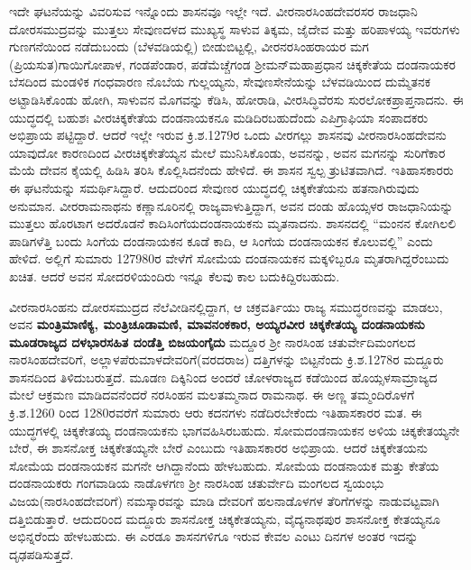 \vskip 2pt

ಇದೇ ಘಟನೆಯನ್ನು ವಿವರಿಸುವ ಇನ್ನೊಂದು ಶಾಸನವೂ ಇಲ್ಲೇ ಇದೆ. ವೀರನಾರಸಿಂಹದೇವರಸರ ರಾಜಧಾನಿ ದೋರಸಮುದ್ರವನ್ನು ಮುತ್ತಲು ಸೇವುಣದಳದ ಮುಖ್ಯಸ್ಥ ಸಾಳುವ ತಿಕ್ಕಮ, ಜೈದೇವ ಮತ್ತು ಹರಿಪಾಳಯ್ಯ ಇವರುಗಳು ಗುಣಗನೆಯಿಂದ ನಡೆದುಬಂದು (ಬೆಳವಡಿಯಲ್ಲಿ) ಬೀಡುಬಿಟ್ಟಲ್ಲಿ, ವೀರನರಸಿಂಹರಾಯರ ಮಗ (ಪ್ರಿಯಸುತ)\break ಗಾಯಿಗೋಪಾಳ, ಗಂಡಪೆಂಡಾರ, ಪಡೆಮೆಚ್ಚೆಗಂಡ ಶ‍್ರೀಮನ್​ಮಹಾಪ್ರಧಾನ ಚಿಕ್ಕಕೇತೆಯ ದಂಡನಾಯಕರ ಬೆಸದಿಂದ ಮಂಡಳಿಕ ಗಂಧವಾರಣ ನೊಬೆಯ ಗುಲ್ಲಯ್ಯನು, ಸೇವುಣಸೇನೆಯನ್ನು ಬೆಳವಡಿಯಿಂದ ದುಮ್ಮೆತನಕ ಅಟ್ಟಾಡಿಸಿಕೊಂಡು ಹೋಗಿ, ಸಾಳುವನ ಮೊಗವನ್ನು ಕೆಡಿಸಿ, ಹೋರಾಡಿ, ವೀರಸಿದ್ಧಿವೆರಸು ಸುರಲೋಕಪ್ರಾಪ್ತನಾದನು. ಈ ಯುದ್ಧದಲ್ಲಿ ಬಹುಶಃ ವೀರಚಿಕ್ಕಕೇತೆಯ ದಂಡನಾಯಕನೂ ಮಡಿದಿರಬಹುದೆಂದು ಎಪಿಗ್ರಾಫಿಯಾ ಸಂಪಾದಕರು ಅಭಿಪ್ರಾಯ ಪಟ್ಟಿದ್ದಾರೆ. ಆದರೆ ಇಲ್ಲೇ ಇರುವ ಕ್ರಿ.ಶ.1279ರ ಒಂದು ವೀರಗಲ್ಲು ಶಾಸನವು ವೀರನಾರಸಿಂಹದೇವನು ಯಾವುದೋ ಕಾರಣದಿಂದ ವೀರಚಿಕ್ಕಕೇತೆಯ್ಯನ ಮೇಲೆ ಮುನಿಸಿಕೊಂಡು, ಅವನನ್ನು, ಅವನ ಮಗನನ್ನು ಸುರಿಗೆಕಾರ ಮೆಯೆ ದೇವನ ಕೈಯಲ್ಲಿ ಹಿಡಿಸಿ ತರಿಸಿ ಕೊಲ್ಲಿಸಿದನೆಂದು ಹೇಳಿದೆ. ಈ ಶಾಸನ ಸ್ವಲ್ಪ ತ್ರುಟಿತವಾಗಿದೆ. ಇತಿಹಾಸಕಾರರು ಈ ಘಟನೆಯನ್ನು ಸಮರ್ಥಿಸಿದ್ದಾರೆ. ಆದುದರಿಂದ ಸೇವುಣರ ಯುದ್ಧದಲ್ಲಿ ಚಿಕ್ಕಕೇತೆಯನು ಹತನಾಗಿರುವುದು ಅನುಮಾನ. ವೀರರಾಮನಾಥನು ಕಣ್ಣಾನೂರಿನಲ್ಲಿ ರಾಜ್ಯವಾಳುತ್ತಿದ್ದಾಗ, ಅವನ ದಂಡು ಹೊಯ್ಸಳರ ರಾಜಧಾನಿಯನ್ನು ಮುತ್ತಲು ಹೊರಟಾಗ ಅದರೊಡನೆ ಕಾದಿ\break ಸಿಂಗೆಯದಂಡನಾಯಕನು ಮೃತನಾದನು. ಶಾಸನದಲ್ಲಿ “ಮಂನನ ಕೋಗಿಲಲಿ ಪಾಡಿಗಳೆತ್ತಿ ಬಂದು ಸಿಂಗೆಯ ದಂಡನಾಯಕನ ಕೂಡೆ ಕಾದಿ, ಆ ಸಿಂಗೆಯ ದಂಡನಾಯಕನ ಕೊಲುವಲ್ಲಿ” ಎಂದು ಹೇಳಿದೆ. ಅಲ್ಲಿಗೆ ಸುಮಾರು 1279\enginline{-}80ರ ವೇಳೆಗೆ ಸೋಮೆಯ ದಂಡನಾಯಕನ ಮಕ್ಕಳಿಬ್ಬರೂ ಮೃತರಾಗಿದ್ದರೆಂಬುದು ಖಚಿತ. ಆದರೆ ಅವನ ಸೋದರಳಿಯಂದಿರು ಇನ್ನೂ ಕೆಲವು ಕಾಲ ಬದುಕಿದ್ದಿರಬಹುದು.

\vskip 2pt

ವೀರನಾರಸಿಂಹನು ದೋರಸಮುದ್ರದ ನೆಲೆವೀಡಿನಲ್ಲಿದ್ದಾಗ, ಆ ಚಕ್ರವರ್ತಿಯು ರಾಜ್ಯ ಸಮುದ್ಧರಣವನ್ನು ಮಾಡಲು, ಅವನ \textbf{ಮಂತ್ರಿಮಾಣಿಕ್ಯ, ಮಂತ್ರಿಚೂಡಾಮಣಿ, ಮಾವನಂಕಕಾರ, ಅಯ್ಯರವೀರ ಚಿಕ್ಕಕೇತಯ್ಯ ದಂಡನಾಯಕನು ಮೂಡರಾಜ್ಯದ ದಳಭಾರಸಹಿತ ದಂಡೆತ್ತಿ ಬಿಜಯಂಗೈದು} ಮದ್ದೂರ ಶ‍್ರೀ ನಾರಸಿಂಹ ಚತುರ್ವೇದಿಮಂಗಲದ ನಾರಸಿಂಹ\-ದೇವರಿಗೆ, ಅಲ್ಲಾಳಪೆರುಮಾಳದೇವರಿಗೆ(ವರದರಾಜ) ದತ್ತಿಗಳನ್ನು ಬಿಟ್ಟನೆಂದು ಕ್ರಿ.ಶ.1278ರ ಮದ್ದೂರು ಶಾಸನದಿಂದ ತಿಳಿದುಬರುತ್ತದೆ. ಮೂಡಣ ದಿಕ್ಕಿನಿಂದ ಅಂದರೆ ಚೋಳರಾಜ್ಯದ ಕಡೆಯಿಂದ ಹೊಯ್ಸಳಸಾಮ್ರಾಜ್ಯದ ಮೇಲೆ ಆಕ್ರಮಣ ಮಾಡಿದವನೆಂದರೆ ನರಸಿಂಹನ ಮಲತಮ್ಮನಾದ ರಾಮನಾಥ. ಈ ಅಣ್ಣ ತಮ್ಮಂದಿರೊಳಗೆ ಕ್ರಿ.ಶ.1260 ರಿಂದ 1280ರವರೆಗೆ ಸುಮಾರು ಆರು ಕದನಗಳು ನಡೆದಿರಬೇಕೆಂದು ಇತಿಹಾಸಕಾರರ ಮತ. ಈ ಯುದ್ಧಗಳಲ್ಲಿ ಚಿಕ್ಕಕೇತಯ್ಯ ದಂಡನಾಯಕನು ಭಾಗವಹಿಸಿರಬಹುದು. ಸೋಮದಂಡನಾಯಕನ ಅಳಿಯ ಚಿಕ್ಕಕೇತಯ್ಯನೇ ಬೇರೆ, ಈ ಶಾಸನೋಕ್ತ ಚಿಕ್ಕಕೇತಯ್ಯನೇ ಬೇರೆ ಎಂಬುದು ಇತಿಹಾಸಕಾರರ ಅಭಿಪ್ರಾಯ. ಆದರೆ ಚಿಕ್ಕಕೇತಯನು ಸೋಮೆಯ ದಂಡನಾಯಕನ ಮಗನೇ ಆಗಿದ್ದಾನೆಂದು ಹೇಳಬಹುದು. ಸೋಮೆಯ ದಂಡನಾಯಕ ಮತ್ತು ಕೇತೆಯ ದಂಡನಾಯಕರು ಗಂಗವಾಡಿಯ ನಾಡೊಳಗಣ ಶ‍್ರೀ ನಾರಸಿಂಹ ಚತುರ್ವೇದಿ ಮಂಗಲದ ಸ್ವಯಂಭು ವಿಜಯ(ನಾರಸಿಂಹದೇವರಿಗೆ) ನಮಸ್ಕಾರವನ್ನು ಮಾಡಿ ದೇವರಿಗೆ ಹಲನಾಡೊಳಗಳ ತೆರಿಗೆಗಳನ್ನು ನಾಡುವಟ್ಟವಾಗಿ ದತ್ತಿಬಿಡುತ್ತಾರೆ. ಆದುದರಿಂದ ಮದ್ದೂರು ಶಾಸನೋಕ್ತ ಚಿಕ್ಕಕೇತಯ್ಯನು, ವೈದ್ಯನಾಥಪುರ ಶಾಸನೋಕ್ತ ಕೇತಯ್ಯನೂ ಅಭಿನ್ನರೆಂದು ಹೇಳಬಹುದು. ಈ ಎರಡೂ ಶಾಸನಗಳಿಗೂ ಇರುವ ಕೇವಲ ಎಂಟು ದಿನಗಳ ಅಂತರ ಇದನ್ನು ದೃಢಪಡಿಸುತ್ತದೆ.

